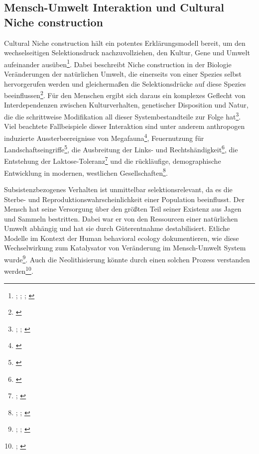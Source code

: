 \documentclass[openany,twoside,twocolumn]{book}
\let\rmarkdownfootnote\footnote%
\def\footnote{\protect\rmarkdownfootnote}
\begin{document}
\hypertarget{mensch-umwelt-interaktion-und-cultural-niche-construction}{%
\subsection{Mensch-Umwelt Interaktion und Cultural Niche
construction}\label{mensch-umwelt-interaktion-und-cultural-niche-construction}}

Cultural Niche construction hält ein potentes Erklärungsmodell bereit,
um den wechselseitigen Selektionsdruck nachzuvollziehen, den Kultur,
Gene und Umwelt aufeinander ausüben\footnote{\textcite{laland_niche_2000};
  \textcite{odling-smee_niche_2003}; \textcite{laland_cultural_2011};
  \textcite{rendell_runaway_2011}}. Dabei beschreibt Niche construction
in der Biologie Veränderungen der natürlichen Umwelt, die einerseits von
einer Spezies selbst hervorgerufen werden und gleichermaßen die
Selektionsdrücke auf diese Spezies beeinflussen\footnote{\textcite{laland_niche_2006}}.
Für den Menschen ergibt sich daraus ein komplexes Geflecht von
Interdependenzen zwischen Kulturverhalten, genetischer Disposition und
Natur, die die schrittweise Modifikation all dieser Systembestandteile
zur Folge hat\footnote{\textcite{alberti_global_2017};
  \textcite{creanza_models_2012}; \textcite{laland_cultural_2001}}. Viel
beachtete Fallbeispiele dieser Interaktion sind unter anderem
anthropogen induzierte Aussterbeereignisse von Megafauna\footnote{\textcite{barnosky_assessing_2004}},
Feuernutzung für Landschaftseingriffe\footnote{\textcite{bird_fire_2008}},
die Ausbreitung der Links- und Rechtshändigkeit\footnote{\textcite{laland_gene-culture_1995}},
die Entstehung der Laktose-Toleranz\footnote{\textcite{feldman_theory_1989};
  \textcite{ingram_population_2012}} und die rückläufige, demographische
Entwicklung in modernen, westlichen Gesellschaften\footnote{\textcite{borgerhoff_mulder_demographic_1998};
  \textcite{fogarty_role_2013}; \textcite{ihara_cultural_2004}}.

Subsistenzbezogenes Verhalten ist unmittelbar selektionsrelevant, da es
die Sterbe- und Reproduktionswahrscheinlichkeit einer Population
beeinflusst. Der Mensch hat seine Versorgung über den größten Teil
seiner Existenz aus Jagen und Sammeln bestritten. Dabei war er von den
Ressourcen einer natürlichen Umwelt abhängig und hat sie durch
Güterentnahme destabilisiert. Etliche Modelle im Kontext der Human
behavioral ecology dokumentieren, wie diese Wechselwirkung zum
Katalysator von Veränderung im Mensch-Umwelt System wurde\footnote{\textcite{hardy_climatic_2010};
  \textcite{hockett_nutritional_2005}; \textcite{stiner_thirty_2001}}.
Auch die Neolithisierung könnte durch einen solchen Prozess verstanden
werden\footnote{\textcite{rowley-conwy_foraging_2011};
  \textcite{smith_onset_2013}}.
\end{document}
